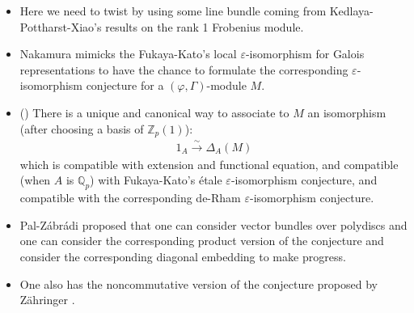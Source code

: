 \documentclass[11pt]{report}
\begin{document}
\begin{itemize}
\item<1-> Here we need to twist by using some line bundle coming from Kedlaya-Pottharst-Xiao's results \cite[Theorem 6.2.14]{KPX} on the rank 1 Frobenius module.
\item<2-> Nakamura mimicks the Fukaya-Kato's local $\varepsilon$-isomorphism for Galois representations to have the chance to formulate the corresponding $\varepsilon$-isomorphism conjecture for a $(\varphi,\Gamma)$-module $M$. 
\item<3-> () There is a unique and canonical way to associate to $M$ an isomorphism (after choosing a basis of $\mathbb{Z}_p(1)$):
\begin{align}
1_A\overset{\sim}{\longrightarrow}	\Delta_A(M)
\end{align}
 which is compatible with extension and functional equation, and compatible (when $A$ is $\mathbb{Q}_p$) with Fukaya-Kato's \'etale $\varepsilon$-isomorphism conjecture, and compatible with the corresponding de-Rham $\varepsilon$-isomorphism conjecture. 
\item<4-> Pal-Z\'abr\'adi \cite{PZ} proposed that one can consider vector bundles over polydiscs and one can consider the corresponding product version of the conjecture and consider the corresponding diagonal embedding to make progress. 
\item<5-> One also has the noncommutative version of the conjecture proposed by Z\"ahringer \cite{Z}.
\end{itemize}
	
\end{document}
